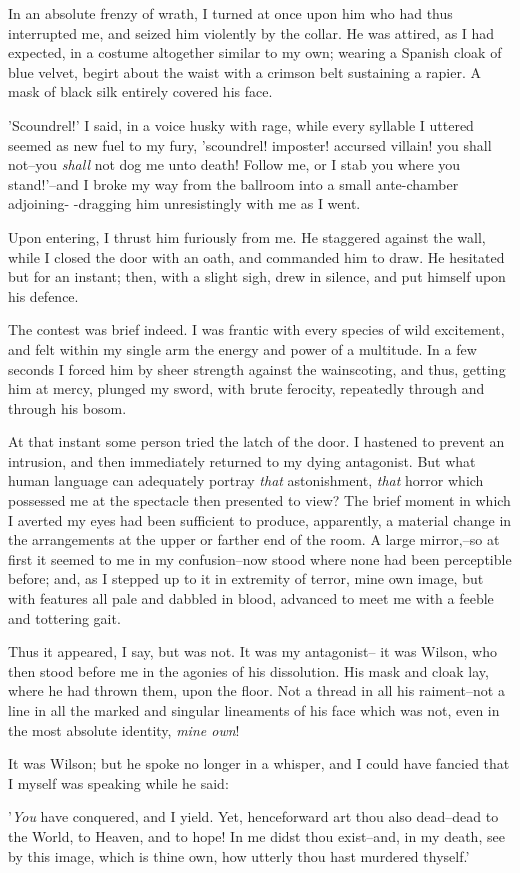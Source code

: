 \documentclass[12pt]{book}
\begin{document}
     In an absolute frenzy of wrath, I turned at once upon him who
had thus interrupted me, and seized him violently by the collar. 
He was attired, as I had expected, in a costume altogether similar
to my own; wearing a Spanish cloak of blue velvet, begirt about the
waist with a crimson belt sustaining a rapier.  A mask of black
silk entirely covered his face.

     'Scoundrel!' I said, in a voice husky with rage, while every
syllable I uttered seemed as new fuel to my fury, 'scoundrel!
imposter! accursed villain! you shall not--you \emph{shall} not dog me
unto death!  Follow me, or I stab you where you stand!'--and I
broke my way from the ballroom into a small ante-chamber adjoining-
-dragging him unresistingly with me as I went.

     Upon entering, I thrust him furiously from me.  He staggered
against the wall, while I closed the door with an oath, and
commanded him to draw.  He hesitated but for an instant; then, with
a slight sigh, drew in silence, and put himself upon his defence.

     The contest was brief indeed.  I was frantic with every
species of wild excitement, and felt within my single arm the
energy and power of a multitude.  In a few seconds I forced him by
sheer strength against the wainscoting, and thus, getting him at
mercy, plunged my sword, with brute ferocity, repeatedly through
and through his bosom.

     At that instant some person tried the latch of the door.  I
hastened to prevent an intrusion, and then immediately returned to
my dying antagonist.  But what human language can adequately
portray \emph{that} astonishment, \emph{that} horror which possessed me
at the spectacle then presented to view?  The brief moment
in which I averted my eyes had been sufficient to produce,
apparently, a material change in the arrangements at the upper or
farther end of the room.  A large mirror,--so at first it seemed to
me in my confusion--now stood where none had been perceptible
before; and, as I stepped up to it in extremity of terror, mine own
image, but with features all pale and dabbled in blood, advanced to
meet me with a feeble and tottering gait.

     Thus it appeared, I say, but was not.  It was my antagonist--
it was Wilson, who then stood before me in the agonies of his
dissolution.  His mask and cloak lay, where he had thrown them,
upon the floor.  Not a thread in all his raiment--not a line in all
the marked and singular lineaments of his face which was not, even
in the most absolute identity, \emph{mine own}!

     It was Wilson; but he spoke no longer in a whisper, and I
could have fancied that I myself was speaking while he said:

     '\emph{You} have conquered, and I yield.  Yet, henceforward art
thou also dead--dead to the World, to Heaven, and to hope!  In me
didst thou exist--and, in my death, see by this image, which is
thine own, how utterly thou hast murdered thyself.'
\end{document}
